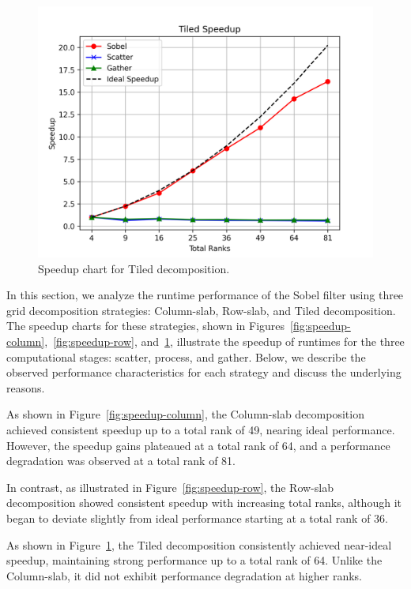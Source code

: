 \begin{figure}[htbp]
    \centering
    \includegraphics[width=1.0\linewidth]{images/tiled_speedup.png}
    \caption{Speedup chart for Tiled decomposition.}
    \label{fig:speedup-tiled}
\end{figure}

In this section, we analyze the runtime performance of the Sobel filter using three grid decomposition strategies: Column-slab, Row-slab, and Tiled decomposition. The speedup charts for these strategies, shown in Figures~\ref{fig:speedup-column},~\ref{fig:speedup-row}, and~\ref{fig:speedup-tiled}, illustrate the speedup of runtimes for the three computational stages: scatter, process, and gather. Below, we describe the observed performance characteristics for each strategy and discuss the underlying reasons.

As shown in Figure~\ref{fig:speedup-column}, the Column-slab decomposition achieved consistent speedup up to a total rank of 49, nearing ideal performance. However, the speedup gains plateaued at a total rank of 64, and a performance degradation was observed at a total rank of 81.

In contrast, as illustrated in Figure~\ref{fig:speedup-row}, the Row-slab decomposition showed consistent speedup with increasing total ranks, although it began to deviate slightly from ideal performance starting at a total rank of 36.

As shown in Figure~\ref{fig:speedup-tiled}, the Tiled decomposition consistently achieved near-ideal speedup, maintaining strong performance up to a total rank of 64. Unlike the Column-slab, it did not exhibit performance degradation at higher ranks.

